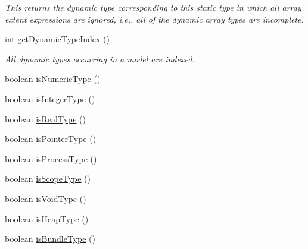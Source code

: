 \begin{DoxyCompactItemize}
\begin{DoxyCompactList}\small\item\em This returns the dynamic type corresponding to this static type in which all array extent expressions are ignored, i.\+e., all of the dynamic array types are incomplete. \end{DoxyCompactList}\item 
int \hyperlink{interfaceedu_1_1udel_1_1cis_1_1vsl_1_1civl_1_1model_1_1IF_1_1type_1_1CIVLType_af806f7bcd3ac7859a7f820ca55488ff8}{get\+Dynamic\+Type\+Index} ()
\begin{DoxyCompactList}\small\item\em All dynamic types occurring in a model are indexed. \end{DoxyCompactList}\item 
boolean \hyperlink{interfaceedu_1_1udel_1_1cis_1_1vsl_1_1civl_1_1model_1_1IF_1_1type_1_1CIVLType_a0122255e509357622e3eef6b50ee70ce}{is\+Numeric\+Type} ()
\item 
boolean \hyperlink{interfaceedu_1_1udel_1_1cis_1_1vsl_1_1civl_1_1model_1_1IF_1_1type_1_1CIVLType_af0a976686814fff1d5a8c090be3ede40}{is\+Integer\+Type} ()
\item 
boolean \hyperlink{interfaceedu_1_1udel_1_1cis_1_1vsl_1_1civl_1_1model_1_1IF_1_1type_1_1CIVLType_af46257d64202a86830bf518b291043f5}{is\+Real\+Type} ()
\item 
boolean \hyperlink{interfaceedu_1_1udel_1_1cis_1_1vsl_1_1civl_1_1model_1_1IF_1_1type_1_1CIVLType_a1cb123f9248c8469b566d1007fd8536c}{is\+Pointer\+Type} ()
\item 
boolean \hyperlink{interfaceedu_1_1udel_1_1cis_1_1vsl_1_1civl_1_1model_1_1IF_1_1type_1_1CIVLType_a37fbc9bc2cda81b40901033cd831d700}{is\+Process\+Type} ()
\item 
boolean \hyperlink{interfaceedu_1_1udel_1_1cis_1_1vsl_1_1civl_1_1model_1_1IF_1_1type_1_1CIVLType_ab3184abad84c247d9f8f2f4d86cb0b9c}{is\+Scope\+Type} ()
\item 
boolean \hyperlink{interfaceedu_1_1udel_1_1cis_1_1vsl_1_1civl_1_1model_1_1IF_1_1type_1_1CIVLType_a733473a5ca1ca38b483a33435d1721e0}{is\+Void\+Type} ()
\item 
boolean \hyperlink{interfaceedu_1_1udel_1_1cis_1_1vsl_1_1civl_1_1model_1_1IF_1_1type_1_1CIVLType_adfbc8da7beab0f682ed6d4e02b68b9d8}{is\+Heap\+Type} ()
\item 
boolean \hyperlink{interfaceedu_1_1udel_1_1cis_1_1vsl_1_1civl_1_1model_1_1IF_1_1type_1_1CIVLType_a97c47215fa88e49459d85cf376bf09c6}{is\+Bundle\+Type} ()
\item 

\end{DoxyCompactItemize}
